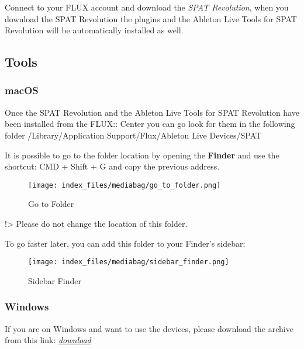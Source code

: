 \documentclass[
  letterpaper,
  DIV=11,
  numbers=noendperiod]{scrreport}
\begin{document}
Connect to your FLUX account and download the \emph{SPAT Revolution},
when you download the SPAT Revolution the plugins and the Ableton Live
Tools for SPAT Revolution will be automatically installed as well.

\hypertarget{tools}{%
\subsection{Tools}\label{tools}}

\hypertarget{macos}{%
\subsubsection{macOS}\label{macos}}

Once the SPAT Revolution and the Ableton Live Tools for SPAT Revolution
have been installed from the FLUX:: Center you can go look for them in
the following folder /Library/Application Support/Flux/Ableton Live
Devices/SPAT

It is possible to go to the folder location by opening the
\textbf{Finder} and use the shortcut: CMD + Shift + G and copy the
previous address.

\begin{figure}

{\centering \texttt{[image: index\_files/mediabag/go\_to\_folder.png]}

}

\caption{Go to Folder}

\end{figure}

!\textgreater{} Please do not change the location of this folder.

To go faster later, you can add this folder to your Finder's sidebar:

\begin{figure}

{\centering \texttt{[image: index\_files/mediabag/sidebar\_finder.png]}

}

\caption{Sidebar Finder}

\end{figure}

\hypertarget{windows}{%
\subsubsection{Windows}\label{windows}}

If you are on Windows and want to use the devices, please download the
archive from this link:
\href{https://public.3.basecamp.com/p/wFaCfQqbHBgzx2AYReXehVGd/upload/download/Ableton\%20Live\%20Tools\%20for\%20SPAT\%20Revolution\%20-\%20Windows.zip?disposition=attachment}{\emph{download}}
\end{document}
